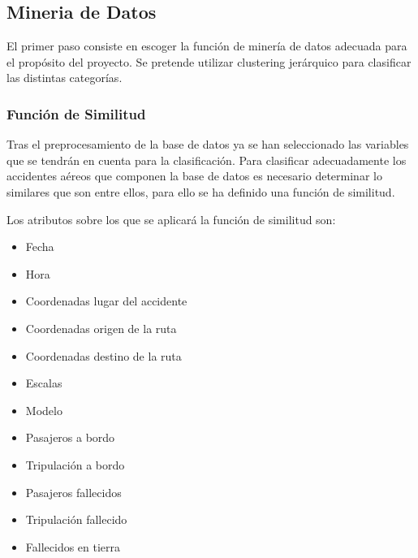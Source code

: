 \documentclass[a4paper,10pt]{article}
\begin{document}
\subsection{Mineria de Datos}
El primer paso consiste en escoger la funci\'on de miner\'ia de datos adecuada para el prop\'osito del proyecto. Se pretende utilizar clustering jer\'arquico para clasificar las distintas categor\'ias.


\subsubsection{Funci\'on de Similitud}
Tras el preprocesamiento de la base de datos ya se han seleccionado las variables que se tendr\'an en cuenta para la clasificaci\'on.
Para clasificar adecuadamente los accidentes a\'ereos que componen la base de datos es necesario determinar lo similares que son entre ellos, para ello se ha definido una funci\'on de similitud.

Los atributos sobre los que se aplicar\'a la funci\'on de similitud son:
\begin{itemize}
\item Fecha
\item Hora
\item Coordenadas lugar del accidente
\item Coordenadas origen de la ruta
\item Coordenadas destino de la ruta
\item Escalas
\item Modelo
\item Pasajeros a bordo
\item Tripulaci\'on a bordo
\item Pasajeros fallecidos
\item Tripulaci\'on fallecido
\item Fallecidos en tierra
\end{itemize}
\end{document}
